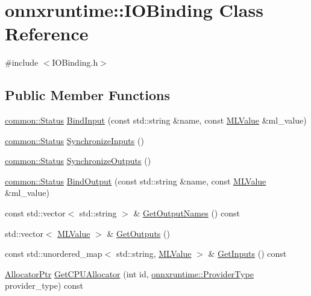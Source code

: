 \hypertarget{classonnxruntime_1_1IOBinding}{}\section{onnxruntime\+:\+:I\+O\+Binding Class Reference}
\label{classonnxruntime_1_1IOBinding}


{\ttfamily \#include $<$I\+O\+Binding.\+h$>$}

\subsection*{Public Member Functions}
\begin{DoxyCompactItemize}
\item 
\mbox{\hyperlink{classonnxruntime_1_1common_1_1Status}{common\+::\+Status}} \mbox{\hyperlink{classonnxruntime_1_1IOBinding_ac1217bbb8ec78b47ad58c343cdd15f7c}{Bind\+Input}} (const std\+::string \&name, const \mbox{\hyperlink{classonnxruntime_1_1MLValue}{M\+L\+Value}} \&ml\+\_\+value)
\item 
\mbox{\hyperlink{classonnxruntime_1_1common_1_1Status}{common\+::\+Status}} \mbox{\hyperlink{classonnxruntime_1_1IOBinding_a03022da7eb066502cae7288f13ef1625}{Synchronize\+Inputs}} ()
\item 
\mbox{\hyperlink{classonnxruntime_1_1common_1_1Status}{common\+::\+Status}} \mbox{\hyperlink{classonnxruntime_1_1IOBinding_a2d4ea18ada1b7227d9fd73a4576713f8}{Synchronize\+Outputs}} ()
\item 
\mbox{\hyperlink{classonnxruntime_1_1common_1_1Status}{common\+::\+Status}} \mbox{\hyperlink{classonnxruntime_1_1IOBinding_ad060d48245f5873694878e419cd2fdc9}{Bind\+Output}} (const std\+::string \&name, const \mbox{\hyperlink{classonnxruntime_1_1MLValue}{M\+L\+Value}} \&ml\+\_\+value)
\item 
const std\+::vector$<$ std\+::string $>$ \& \mbox{\hyperlink{classonnxruntime_1_1IOBinding_a42617f235c1a5cc9b5efe8bfeabedfd1}{Get\+Output\+Names}} () const
\item 
std\+::vector$<$ \mbox{\hyperlink{classonnxruntime_1_1MLValue}{M\+L\+Value}} $>$ \& \mbox{\hyperlink{classonnxruntime_1_1IOBinding_a2200c675c3fa6c3aa11de0847082fe33}{Get\+Outputs}} ()
\item 
const std\+::unordered\+\_\+map$<$ std\+::string, \mbox{\hyperlink{classonnxruntime_1_1MLValue}{M\+L\+Value}} $>$ \& \mbox{\hyperlink{classonnxruntime_1_1IOBinding_a97181d4c755d6588da31fe25d7dbed49}{Get\+Inputs}} () const
\item 
\mbox{\hyperlink{namespaceonnxruntime_a6cdac724c5dcefded3a63f08dae58fda}{Allocator\+Ptr}} \mbox{\hyperlink{classonnxruntime_1_1IOBinding_a1210c428eaa9cf938914c9e38e6b9a77}{Get\+C\+P\+U\+Allocator}} (int id, \mbox{\hyperlink{namespaceonnxruntime_a863e2227cbf32aab76aad35fdadff4bb}{onnxruntime\+::\+Provider\+Type}} provider\+\_\+type) const
\end{DoxyCompactItemize}


